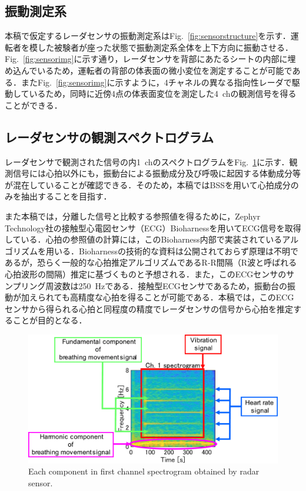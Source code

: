 \documentclass[11pt]{jarticle}
\begin{document}
\subsection{振動測定系}
\hspace{1.0em}

本稿で仮定するレーダセンサの振動測定系はFig.~\ref{fig:sensorstructure}を示す．運転者を模した被験者が座った状態で振動測定系全体を上下方向に振動させる．Fig.~\ref{fig:sensorimg}に示す通り，レーダセンサを背部にあたるシートの内部に埋め込んでいるため，運転者の背部の体表面の微小変位を測定することが可能である．またFig.~\ref{fig:sensorimg}に示すように，4チャネルの異なる指向性レーダで駆動しているため，同時に近傍4点の体表面変位を測定した4~chの観測信号を得ることができる．

\subsection{レーダセンサの観測スペクトログラム}
\hspace{1.0em}

レーダセンサで観測された信号の内1~chのスペクトログラムをFig.~\ref{fig:1chobs}に示す．観測信号には心拍以外にも，振動台による振動成分及び呼吸に起因する体動成分等が混在していることが確認できる．そのため，本稿ではBSSを用いて心拍成分のみを抽出することを目指す．

また本稿では，分離した信号と比較する参照値を得るために，Zephyr Technology社の接触型心電図センサ（ECG）Bioharnessを用いてECG信号を取得している．心拍の参照値の計算には，このBioharness内部で実装されているアルゴリズムを用いる．Bioharnessの技術的な資料は公開されておらず原理は不明であるが，恐らく一般的な心拍推定アルゴリズムであるR-R間隔（R波と呼ばれる心拍波形の間隔）推定に基づくものと予想される．また，このECGセンサのサンプリング周波数は250~Hzである．接触型ECGセンサであるため，振動台の振動が加えられても高精度な心拍を得ることが可能である．本稿では，このECGセンサから得られる心拍と同程度の精度でレーダセンサの信号から心拍を推定することが目的となる．

\begin{figure}[tb]
  \centering
  \vspace{0pt} %
  \includegraphics[width=1.0\columnwidth]{1chobsspect.pdf}
  \vspace{-20pt} %
  \caption{Each component in first channel spectrogram obtained by radar sensor.}
  \vspace{-20pt} %
  \label{fig:1chobs}
\end{figure}
\end{document}
